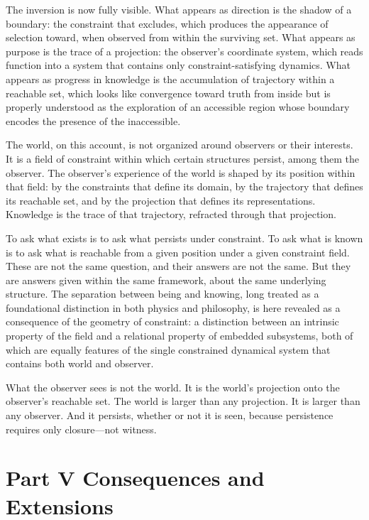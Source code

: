 \documentclass[12pt, a4paper, oneside]{article}
\theoremstyle{plain}
\theoremstyle{definition}
\theoremstyle{remark}
\begin{document}
The inversion is now fully visible. What appears as direction is the shadow of a boundary: the constraint that excludes, which produces the appearance of selection toward, when observed from within the surviving set. What appears as purpose is the trace of a projection: the observer's coordinate system, which reads function into a system that contains only constraint-satisfying dynamics. What appears as progress in knowledge is the accumulation of trajectory within a reachable set, which looks like convergence toward truth from inside but is properly understood as the exploration of an accessible region whose boundary encodes the presence of the inaccessible.

The world, on this account, is not organized around observers or their interests. It is a field of constraint within which certain structures persist, among them the observer. The observer's experience of the world is shaped by its position within that field: by the constraints that define its domain, by the trajectory that defines its reachable set, and by the projection that defines its representations. Knowledge is the trace of that trajectory, refracted through that projection.

To ask what exists is to ask what persists under constraint. To ask what is known is to ask what is reachable from a given position under a given constraint field. These are not the same question, and their answers are not the same. But they are answers given within the same framework, about the same underlying structure. The separation between being and knowing, long treated as a foundational distinction in both physics and philosophy, is here revealed as a consequence of the geometry of constraint: a distinction between an intrinsic property of the field and a relational property of embedded subsystems, both of which are equally features of the single constrained dynamical system that contains both world and observer.

What the observer sees is not the world. It is the world's projection onto the observer's reachable set. The world is larger than any projection. It is larger than any observer. And it persists, whether or not it is seen, because persistence requires only closure---not witness.

\section*{Part V \quad Consequences and Extensions}
\end{document}
